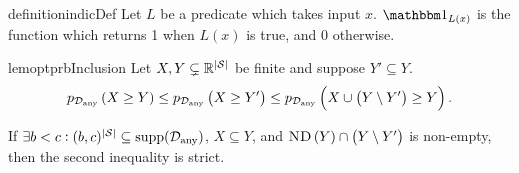 \begin{restatable}{definition}{indicDef}
Let $L$ be a predicate which takes input $x$. $\indic{L(x)}$ is the function which returns 1 when $L(x)$ is true, and 0 otherwise.
\end{restatable} 

\begin{restatable}{lem}{optprbInclusion}\label{lem:inclusion-opt}
Let $X,Y\subsetneq \mathbb{R}^{\left|\mathcal{S}\right|}$ be finite and suppose $Y'\subseteq Y$. \begin{equation}
    \phelper{X\geq Y}[\Dany]\leq\phelper{X\geq Y'}[\Dany]\leq \phelper{X\cup\prn{Y\setminus Y'}\geq Y}[\Dany].\label{eq:inclusion-opt}
\end{equation}

If $\exists b<c: (b,c)^{\abs{\St}}\subseteq \supp[\Dany]$, $X\subseteq Y$, and $\text{\upshape\textsc{ND}}\left(Y\right)\cap \left(Y\setminus Y'\right)$ is non-empty, then the second inequality is strict.
\end{restatable}
